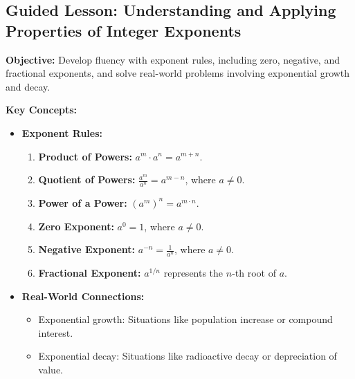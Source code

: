\documentclass[12pt]{article}
\title{}
\date{}
\begin{document}
\subsection*{Guided Lesson: Understanding and Applying Properties of Integer Exponents}
\onehalfspacing

\begin{tcolorbox}[colframe=black!40, colback=gray!5, 
coltitle=black, colbacktitle=black!20, fonttitle=\bfseries\Large, 
title=Learning Objective, halign title=center, left=5pt, right=5pt, top=5pt, bottom=15pt]
\textbf{Objective:} Develop fluency with exponent rules, including zero, negative, and fractional exponents, and solve real-world problems involving exponential growth and decay.
\end{tcolorbox}

\vspace{1em}

\begin{tcolorbox}[colframe=black!60, colback=white, 
coltitle=black, colbacktitle=black!15, fonttitle=\bfseries\Large, 
title=Key Concepts and Vocabulary, halign title=center, left=10pt, right=10pt, top=10pt, bottom=15pt]
\textbf{Key Concepts:}
\begin{itemize}
    \item \textbf{Exponent Rules:}
    \begin{enumerate}
        \item \textbf{Product of Powers:} \( a^m \cdot a^n = a^{m+n} \).
        \item \textbf{Quotient of Powers:} \( \frac{a^m}{a^n} = a^{m-n} \), where \( a \neq 0 \).
        \item \textbf{Power of a Power:} \( (a^m)^n = a^{m \cdot n} \).
        \item \textbf{Zero Exponent:} \( a^0 = 1 \), where \( a \neq 0 \).
        \item \textbf{Negative Exponent:} \( a^{-n} = \frac{1}{a^n} \), where \( a \neq 0 \).
        \item \textbf{Fractional Exponent:} \( a^{1/n} \) represents the \(n\)-th root of \(a\).
    \end{enumerate}
    \item \textbf{Real-World Connections:}
    \begin{itemize}
        \item Exponential growth: Situations like population increase or compound interest.
        \item Exponential decay: Situations like radioactive decay or depreciation of value.
    \end{itemize}
\end{itemize}
\end{tcolorbox}
\end{document}
